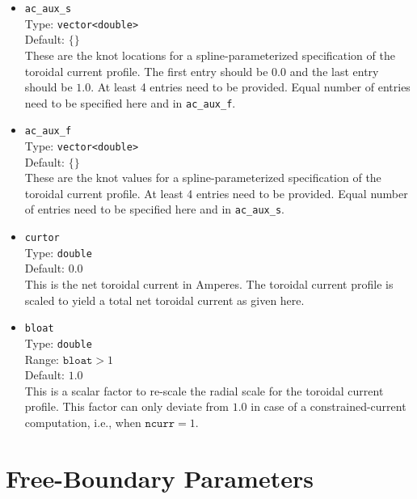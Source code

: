 \begin{itemize}
 \item \texttt{ac\_aux\_s} \\
       Type: \texttt{vector<double>} \\
       Default: $\{ \}$ \\
       These are the knot locations for a spline-parameterized specification
       of the toroidal current profile.
       The first entry should be $0.0$ and the last entry should be $1.0$.
       At least 4 entries need to be provided.
       Equal number of entries need to be specified here and in \texttt{ac\_aux\_f}.

 \item \texttt{ac\_aux\_f} \\
       Type: \texttt{vector<double>} \\
       Default: $\{ \}$ \\
       These are the knot values for a spline-parameterized specification
       of the toroidal current profile.
       At least 4 entries need to be provided.
       Equal number of entries need to be specified here and in \texttt{ac\_aux\_s}.

 \item \texttt{curtor} \\
       Type: \texttt{double} \\
       Default: $0.0$ \\
       This is the net toroidal current in Amperes.
       The toroidal current profile is scaled to yield a total net toroidal current as given here.

 \item \texttt{bloat} \\
       Type: \texttt{double} \\
       Range: $\texttt{bloat} > 1$ \\
       Default: $1.0$ \\
       This is a scalar factor to re-scale the radial scale for the toroidal current profile.
       This factor can only deviate from $1.0$ in case of a constrained-current computation,
       i.e., when $\texttt{ncurr} = 1$.

\end{itemize}

\section{Free-Boundary Parameters}

